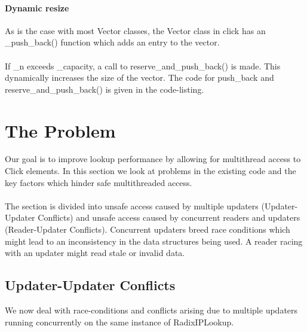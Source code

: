 \documentclass{article}
\begin{document}
\paragraph{Dynamic resize}
As is the case with most Vector classes, the Vector class in click has an \_push\_back() function which adds an entry to the vector.
\\\\ If \_n exceeds \_capacity, a call to reserve\_and\_push\_back() is made. This dynamically increases the size of the vector. The code for push\_back and reserve\_and\_push\_back() is given in the code-listing.

\section{The Problem}
\label{sec:problem}
Our goal is to improve lookup performance by allowing for multithread access to Click elements. In this section we look at problems in the existing code and the key factors which hinder safe multithreaded access.
\\\\The section is divided into unsafe access caused by multiple updaters (Updater-Updater Conflicts) and unsafe access caused by concurrent readers and updaters (Reader-Updater Conflicts). Concurrent updaters breed race conditions which might lead to an inconsistency in the data structures being used. A reader racing with an updater might read stale or invalid data.
\subsection{Updater-Updater Conflicts}
We now deal with race-conditions and conflicts arising due to multiple updaters running concurrently on the same instance of RadixIPLookup.
\end{document}
